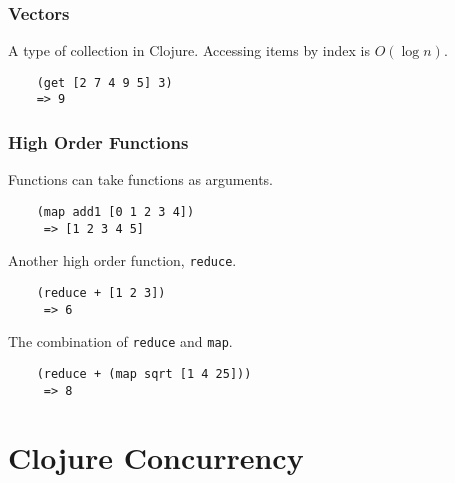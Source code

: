 \documentclass{beamer}
\newcommand{\comment}[1]{{\bf \tt  {#1}}}
\newcommand{\hfcomment}[1]{\textcolor{Teal}{\comment{Henry: {#1}}}}
\newcommand{\clocode}[1]{{\texttt {#1}}}
\begin{document}
\begin{frame}[fragile]
\frametitle{Vectors}
A type of collection in Clojure.
Accessing items by index is $O(\log n)$.
	\begin{verbatim}
	(get [2 7 4 9 5] 3)	
	=> 9
	\end{verbatim}
\end{frame}
\begin{frame}[fragile]
\frametitle{High Order Functions}
 Functions can take functions as arguments.
	\begin{verbatim}
	(map add1 [0 1 2 3 4])
	 => [1 2 3 4 5]
	\end{verbatim}
Another high order function, \clocode{reduce}.
	\begin{verbatim}
	(reduce + [1 2 3])
	 => 6
	\end{verbatim}
The combination of \clocode{reduce} and \clocode{map}.
	\begin{verbatim}
	(reduce + (map sqrt [1 4 25]))
	 => 8
	\end{verbatim}
\end{frame}
\section{Clojure Concurrency}
\end{document}
